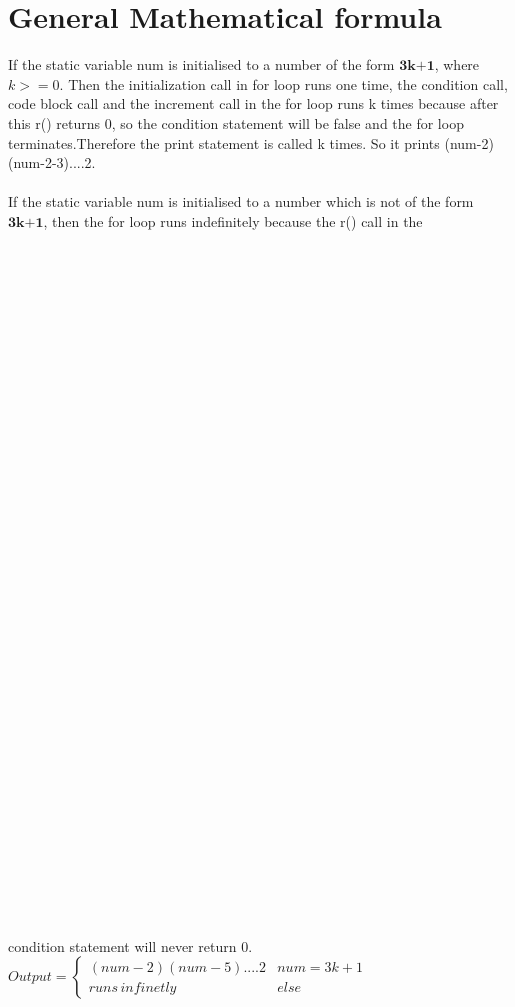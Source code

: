 \documentclass[journal,12pt,twocolumn]{IEEEtran}
\begin{document}
\section{General Mathematical formula}
If the static variable num is initialised to a number of the form $\textbf{3k+1}$, where $k>=0$. Then the initialization call in for loop runs one time, the condition call, code block call and the increment call in the for loop runs k times because after this r() returns 0, so the condition statement will be false and the for loop terminates.Therefore the print statement is called k times. So it prints (num-2)(num-2-3)....2.
\\
\\
If the static variable num is initialised to a number which is not of the form $\textbf{3k+1}$, then the for loop runs indefinitely because the r() call in the
\\
\\
\\
\\
\\
\\
\\
\\
\\
\\
\\
\\
\\
\\
\\
\\
\\
\\
\\
\\
\\
\\
\\
\\
\\
\\
\\
\\
\\
\\
\\
\\
\\
\\
\\
\\
\\
condition statement will never return 0.
$
Output = \begin{cases} 
      (num-2)(num-5)....2 & num=3k+1 \\
      runs\,infinetly & else
   \end{cases}
$
\end{document}
